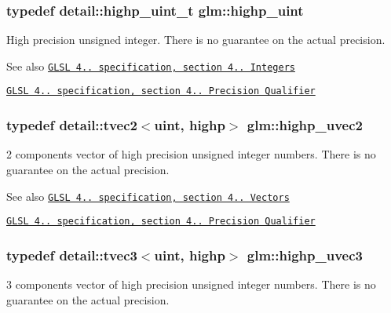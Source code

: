 \subsubsection[{\texorpdfstring{highp\+\_\+uint}{highp_uint}}]{\setlength{\rightskip}{0pt plus 5cm}typedef detail\+::highp\+\_\+uint\+\_\+t {\bf glm\+::highp\+\_\+uint}}\hypertarget{group__core__precision_gabfd1cf11193324a5f77d3831b6ac3205}{}\label{group__core__precision_gabfd1cf11193324a5f77d3831b6ac3205}
High precision unsigned integer. There is no guarantee on the actual precision.

\begin{DoxySeeAlso}{See also}
\href{http://www.opengl.org/registry/doc/GLSLangSpec.4.20.8.pdf}{\tt G\+L\+SL 4.. specification, section 4.. Integers} 

\href{http://www.opengl.org/registry/doc/GLSLangSpec.4.20.8.pdf}{\tt G\+L\+SL 4.. specification, section 4.. Precision Qualifier} 
\end{DoxySeeAlso}
\subsubsection[{\texorpdfstring{highp\+\_\+uvec2}{highp_uvec2}}]{\setlength{\rightskip}{0pt plus 5cm}typedef detail\+::tvec2$<$uint, highp$>$ {\bf glm\+::highp\+\_\+uvec2}}\hypertarget{group__core__precision_gaaf92be4c1fca33cff90c1ed15b521c79}{}\label{group__core__precision_gaaf92be4c1fca33cff90c1ed15b521c79}
2 components vector of high precision unsigned integer numbers. There is no guarantee on the actual precision.

\begin{DoxySeeAlso}{See also}
\href{http://www.opengl.org/registry/doc/GLSLangSpec.4.20.8.pdf}{\tt G\+L\+SL 4.. specification, section 4.. Vectors} 

\href{http://www.opengl.org/registry/doc/GLSLangSpec.4.20.8.pdf}{\tt G\+L\+SL 4.. specification, section 4.. Precision Qualifier} 
\end{DoxySeeAlso}
\subsubsection[{\texorpdfstring{highp\+\_\+uvec3}{highp_uvec3}}]{\setlength{\rightskip}{0pt plus 5cm}typedef detail\+::tvec3$<$uint, highp$>$ {\bf glm\+::highp\+\_\+uvec3}}\hypertarget{group__core__precision_ga66d0e4ae1742ede2eb32bf0bfedd7474}{}\label{group__core__precision_ga66d0e4ae1742ede2eb32bf0bfedd7474}
3 components vector of high precision unsigned integer numbers. There is no guarantee on the actual precision.

